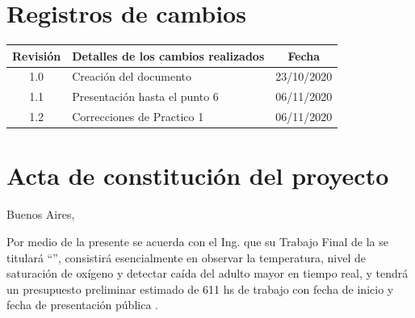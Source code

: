 \documentclass[11pt]{charter}
\begin{document}
\maketitle
\thispagestyle{empty}
\pagebreak


\thispagestyle{empty}
{\setlength{\parskip}{0pt}
\tableofcontents{}
}
\pagebreak


\section{Registros de cambios}
\label{sec:registro}


\begin{table}[ht]
\label{tab:registro}
\centering
\begin{tabularx}{\linewidth}{@{}|c|X|c|@{}}
\hline
\rowcolor[HTML]{C0C0C0} 
Revisión & \multicolumn{1}{c|}{\cellcolor[HTML]{C0C0C0}Detalles de los cambios realizados} & Fecha      \\ \hline
1.0      & Creación del documento                                          & 23/10/2020 \\ \hline
1.1      & Presentación hasta el punto 6                                   & 06/11/2020 \\ \hline
1.2      & Correcciones de Practico 1                                      & 06/11/2020 \\ \hline
\end{tabularx}
\end{table}

\pagebreak



\section{Acta de constitución del proyecto}
\label{sec:acta}

\begin{flushright}
Buenos Aires, \fechaInicioName
\end{flushright}

\vspace{2cm}

Por medio de la presente se acuerda con el Ing. \authorname\hspace{1px} que su Trabajo Final de la \degreename\hspace{1px} se titulará ``\ttitle'', consistirá esencialmente en observar la temperatura, nivel de saturación de oxígeno y detectar caída del adulto mayor en tiempo real, y tendrá un presupuesto preliminar estimado de 611 hs de trabajo con fecha de inicio \fechaInicioName\hspace{1px} y fecha de presentación pública \fechaFinalName.
\end{document}
